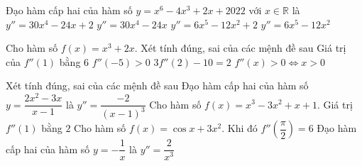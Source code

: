 \begin{ex}%
	Đạo hàm  cấp hai của hàm số $ y=x^6-4x^3+2x+2022$ với $ x\in\mathbb{R}$ là
	 \choice
		{$y''=30x^4-24x+2$} 
		 {$y''=30x^4-24x$}
		{\True $y''=6x^5-12x^2+2$} 
		 {$y''=6x^5-12x^2$}
\end{ex}



\begin{ex}%
 Cho hàm số $f(x)=x^3+2x$. Xét tính đúng, sai  của các mệnh đề sau
 \choiceTF 
  {\True Giá trị của $f''(1)$ bằng $6$} 
   {$f''(-5)>0$}
  {$3f''(2)-10=2$} 
  {\True $f''(x)>0\Leftrightarrow  x>0$}
\end{ex}

\begin{ex}%
 Xét tính  đúng, sai của các mệnh đề sau
  \choiceTF
   {\True Đạo hàm cấp hai của hàm số $y=\dfrac{2x^2-3x}{x-1}$ là $y''=\dfrac{-2}{(x-1)^3}$}
  {Cho hàm số $f(x)=x^3-3x^2+x+1$. Giá trị $f''(1)$  bằng $2$}
  {\True  Cho hàm số $f\left(x\right)=\cos x+3x^{2}$. Khi đó $f''\left(\dfrac{\pi }{2}\right)=6$}
   {Đạo hàm cấp hai của hàm số $y=-\dfrac{1}{x}$ là $y''=\dfrac{2}{x^3}$
  } 
\end{ex}

